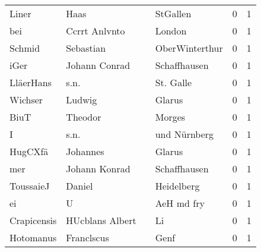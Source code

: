 \begin{tabular}{llllrr}
                    Liner &                               Haas &             &                                    StGallen &          0 &         1 \\
                      bei &                      Ccrrt Anlvnto &             &                                      London &          0 &         1 \\
                   Schmid &                          Sebastian &             &                              OberWinterthur &          0 &         1 \\
                     iGer &                      Johann Conrad &             &                                Schaffhausen &          0 &         1 \\
                LläerHans &                               s.n. &             &                                   St. Galle &          0 &         1 \\
                  Wichser &                             Ludwig &             &                                      Glarus &          0 &         1 \\
                     BiuT &                            Theodor &             &                                      Morges &          0 &         1 \\
                        I &                               s.n. &             &                                und Nürnberg &          0 &         1 \\
                  HugCXfä &                           Johannes &             &                                      Glarus &          0 &         1 \\
                      mer &                      Johann Konrad &             &                                Schaffhausen &          0 &         1 \\
                ToussaieJ &                             Daniel &             &                                  Heidelberg &          0 &         1 \\
                       ei &                                  U &             &                                  AeH md fry &          0 &         1 \\
              Crapicensis &                    HUcblans Albert &             &                                          Li &          0 &         1 \\
                Hotomanus &                         Franclscus &             &                                        Genf &          0 &         1 \\

\end{tabular}
